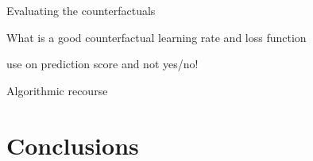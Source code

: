 \documentclass[12pt, smalloffset, compress, aspectratio=1610]{beamer}
\begin{document}
\begin{frame}{Evaluating the counterfactuals}
\label{evaluating-the-counterfactuals}
\end{frame}

\begin{frame}{What is a good counterfactual}
\label{what-is-a-good-counterfactual}
learning rate and loss function

use on prediction score and not yes/no!
\end{frame}

\begin{frame}{Algorithmic recourse}
\label{algorithmic-recourse}
\end{frame}

\section{Conclusions}\label{conclusions}
\end{document}
